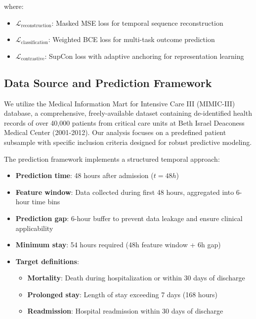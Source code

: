 \documentclass[11pt]{article}
\begin{document}
where:
\begin{itemize}
    \item $\mathcal{L}_{\text{reconstruction}}$: Masked MSE loss for temporal sequence reconstruction
    \item $\mathcal{L}_{\text{classification}}$: Weighted BCE loss for multi-task outcome prediction
    \item $\mathcal{L}_{\text{contrastive}}$: SupCon loss with adaptive anchoring for representation learning
\end{itemize}

\subsection{Data Source and Prediction Framework}

We utilize the Medical Information Mart for Intensive Care III (MIMIC-III) database, a comprehensive, freely-available dataset containing de-identified health records of over 40,000 patients from critical care units at Beth Israel Deaconess Medical Center (2001-2012). Our analysis focuses on a predefined patient subsample with specific inclusion criteria designed for robust predictive modeling.

The prediction framework implements a structured temporal approach:

\begin{itemize}
    \item \textbf{Prediction time}: 48 hours after admission ($t = 48h$)
    \item \textbf{Feature window}: Data collected during first 48 hours, aggregated into 6-hour time bins
    \item \textbf{Prediction gap}: 6-hour buffer to prevent data leakage and ensure clinical applicability
    \item \textbf{Minimum stay}: 54 hours required (48h feature window + 6h gap)
    \item \textbf{Target definitions}:
    \begin{itemize}
        \item \textbf{Mortality}: Death during hospitalization or within 30 days of discharge
        \item \textbf{Prolonged stay}: Length of stay exceeding 7 days (168 hours)
        \item \textbf{Readmission}: Hospital readmission within 30 days of discharge
    \end{itemize}
\end{itemize}
\end{document}
